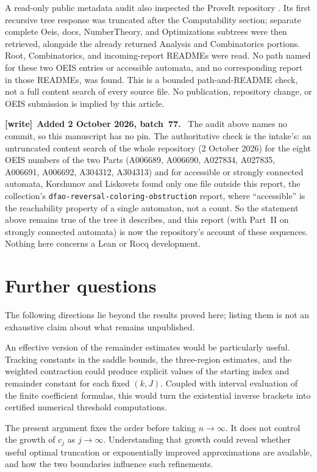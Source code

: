 \documentclass[11pt,letterpaper]{article}
\theoremstyle{remark}\newtheorem{remark}[theorem]{Remark}
\numberwithin{equation}{section}
\newenvironment{writenote}[1][]{\par\smallskip\begingroup\small
 \noindent\textbf{[write]}\if\relax\detokenize{#1}\relax\else~\textbf{#1.}\fi\ }%
 {\par\endgroup\smallskip}
\begin{document}
A read-only public metadata audit also inspected the ProveIt repository \cite{proveit}. Its first recursive tree response was truncated after the Computability section; separate complete Oeis, docs, NumberTheory, and Optimizations subtrees were then retrieved, alongside the already returned Analysis and Combinatorics portions. Root, Combinatorics, and incoming-report READMEs were read. No path named for these two OEIS entries or accessible automata, and no corresponding report in those READMEs, was found. This is a bounded path-and-README check, not a full content search of every source file. No publication, repository change, or OEIS submission is implied by this article.
\begin{writenote}[Added 2 October 2026, batch~77]
The audit above names no commit, so this manuscript has no pin. The
authoritative check is the intake's: an untruncated content search of the
whole repository (2 October 2026) for the eight OEIS numbers of the two
Parts (A006689, A006690, A027834, A027835, A006691, A006692, A304312,
A304313) and for accessible or strongly connected automata, Korshunov and
Liskovets found only one file outside this report, the collection's
\texttt{dfao-\allowbreak reversal-\allowbreak coloring-\allowbreak obstruction}
report, where ``accessible'' is the reachability property of a single
automaton, not a count. So the statement above remains true of the tree it
describes, and this report (with Part~II on strongly connected automata) is
now the repository's account of these sequences. Nothing here concerns a
Lean or Rocq development.
\end{writenote}

\section{Further questions}\label{asa:acc:sec:further}
The following directions lie beyond the results proved here; listing them is not an exhaustive claim about what remains unpublished.

An effective version of the remainder estimates would be particularly useful. Tracking constants in the saddle bounds, the three-region estimates, and the weighted contraction could produce explicit values of the starting index and remainder constant for each fixed $(k,J)$. Coupled with interval evaluation of the finite coefficient formulas, this would turn the existential inverse brackets into certified numerical threshold computations.

The present argument fixes the order before taking $n\to\infty$. It does not control the growth of $c_j$ as $j\to\infty$. Understanding that growth could reveal whether useful optimal truncation or exponentially improved approximations are available, and how the two boundaries influence such refinements.
\end{document}
